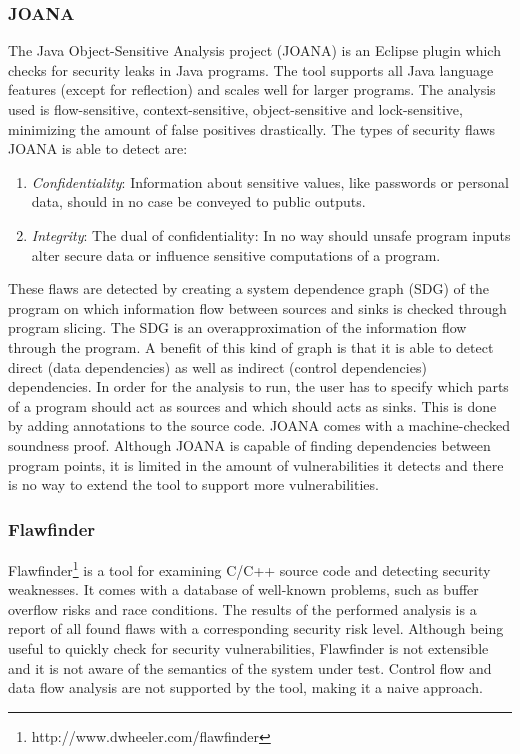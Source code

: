 \subsubsection*{JOANA}
The Java Object-Sensitive Analysis project (JOANA\cite{JOANA}) is an Eclipse plugin which checks for security leaks in Java programs. The tool supports all Java language features (except for reflection) and scales well for larger programs. The analysis used is flow-sensitive, context-sensitive, object-sensitive and lock-sensitive, minimizing the amount of false positives drastically. The types of security flaws JOANA is able to detect are:
\begin{enumerate}
\item \textit{Confidentiality}: Information about sensitive values, like passwords or personal data, should in no case be conveyed to public outputs.
\item \textit{Integrity}: The dual of confidentiality: In no way should unsafe program inputs alter secure data or influence sensitive computations of a program.
\end{enumerate}
These flaws are detected by creating a system dependence graph (SDG) of the program on which information flow between sources and sinks is checked through program slicing. The SDG is an overapproximation of the information flow through the program. A benefit of this kind of graph is that it is able to detect direct (data dependencies) as well as indirect (control dependencies) dependencies. In order for the analysis to run, the user has to specify which parts of a program should act as sources and which should acts as sinks. This is done by adding annotations to the source code. JOANA comes with a machine-checked soundness proof. Although JOANA is capable of finding dependencies between program points, it is limited in the amount of vulnerabilities it detects and there is no way to extend the tool to support more vulnerabilities.

\subsubsection*{Flawfinder}
Flawfinder\footnote{http://www.dwheeler.com/flawfinder} is a tool for examining C/C++ source code and detecting security weaknesses. It comes with a database of well-known problems, such as buffer overflow risks and race conditions. The results of the performed analysis is a report of all found flaws with a corresponding security risk level. Although being useful to quickly check for security vulnerabilities, Flawfinder is not extensible and it is not aware of the semantics of the system under test. Control flow and data flow analysis are not supported by the tool, making it a naive approach.

